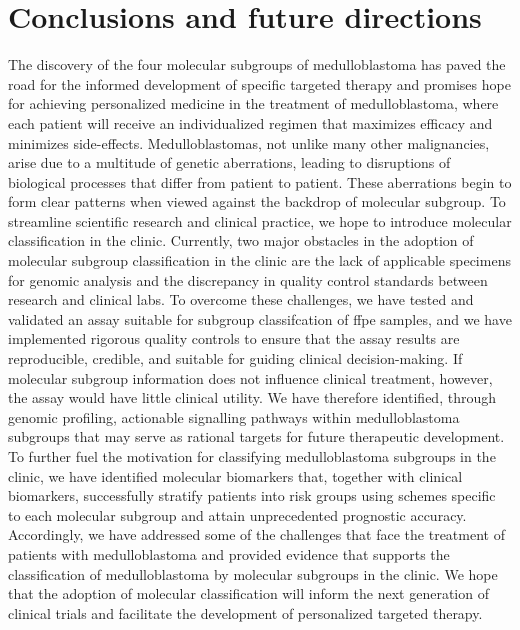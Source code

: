 \chapter{Conclusions and future directions}
\label{ch:conclusions}

The discovery of the four molecular subgroups of medulloblastoma has paved the road for the informed development of specific targeted therapy and promises hope for achieving personalized medicine in the treatment of medulloblastoma, where each patient will receive an individualized regimen that maximizes efficacy and minimizes side-effects. Medulloblastomas, not unlike many other malignancies, arise due to a multitude of genetic aberrations, leading to disruptions of biological processes that differ from patient to patient. These aberrations begin to form clear patterns when viewed against the backdrop of molecular subgroup. To streamline scientific research and clinical practice, we hope to introduce molecular classification in the clinic. Currently, two major obstacles in the adoption of molecular subgroup classification in the clinic are the lack of applicable specimens for genomic analysis and the discrepancy in quality control standards between research and clinical labs. To overcome these challenges, we have tested and validated an assay suitable for subgroup classifcation of \gls{ffpe} samples, and we have implemented rigorous quality controls to ensure that the assay results are reproducible, credible, and suitable for guiding clinical decision-making. If molecular subgroup information does not influence clinical treatment, however, the assay would have little clinical utility. We have therefore identified, through genomic profiling, actionable signalling pathways within medulloblastoma subgroups that may serve as rational targets for future therapeutic development. To further fuel the motivation for classifying medulloblastoma subgroups in the clinic, we have identified molecular biomarkers that, together with clinical biomarkers, successfully stratify patients into risk groups using schemes specific to each molecular subgroup and attain unprecedented prognostic accuracy. Accordingly, we have addressed some of the challenges that face the treatment of patients with medulloblastoma and provided evidence that supports the classification of medulloblastoma by molecular subgroups in the clinic. We hope that the adoption of molecular classification will inform the next generation of clinical trials and facilitate the development of personalized targeted therapy.

